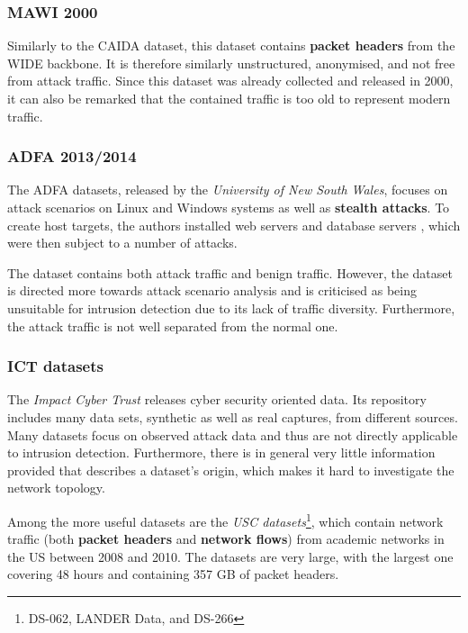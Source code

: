 \documentclass[a4paper,12pt,twoside]{report}
\begin{document}
\subsubsection*{MAWI 2000 \cite{sony2000traffic}}



Similarly to the CAIDA dataset, this dataset contains \textbf{packet headers} from the WIDE backbone. It is therefore similarly unstructured, anonymised, and not free from attack traffic. Since this dataset was already collected and released in 2000, it can also be remarked that the contained traffic is too old to represent modern traffic. 

\subsubsection*{ADFA 2013/2014 \cite{creech2014developing,creech2013generation}}

The ADFA datasets, released by the \textit{University of New South Wales}, focuses on attack scenarios on Linux and Windows systems as well as \textbf{stealth attacks}. To create host targets, the authors  installed web servers and database servers , which were then subject to a number of attacks. 

The dataset contains both attack traffic and benign traffic. However, the dataset is directed more towards attack scenario analysis and is criticised as being unsuitable for intrusion detection due to its lack of traffic diversity. Furthermore, the attack traffic is not well separated from the normal one.

\subsubsection*{ICT datasets \cite{USC2010ICT}}

The \textit{Impact Cyber Trust} releases cyber security oriented data. Its repository includes many data sets, synthetic as well as real captures, from different sources. Many datasets focus on observed attack data and thus are not directly applicable to intrusion detection. Furthermore, there is in general very little information provided that describes a dataset's origin, which makes it hard to investigate the network topology.

Among the more useful datasets are the \textit{USC datasets}\footnote{DS-062, LANDER Data, and DS-266}, which contain network traffic (both \textbf{packet headers} and \textbf{network flows}) from academic networks in the US between 2008 and 2010. The datasets are very large, with the largest one covering 48 hours and containing 357 GB of packet headers. 
\end{document}
